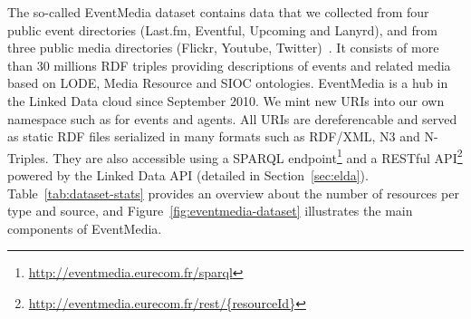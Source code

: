 The so-called EventMedia dataset contains data that we collected from four public event directories (Last.fm, Eventful, Upcoming and Lanyrd), and from three public media directories (Flickr, Youtube, Twitter)~\cite{Khrouf:SWJ12}. It consists of more than 30 millions RDF triples providing descriptions of events and related media based on LODE, Media Resource and SIOC ontologies. EventMedia is a hub in the Linked Data cloud since September 2010. We mint new URIs into our own namespace such as for
events and
agents. All URIs are dereferencable and served as static RDF files serialized in many formats such as RDF/XML, N3 and N-Triples. They are also accessible using a SPARQL endpoint\footnote{\url{http://eventmedia.eurecom.fr/sparql}} and a RESTful API\footnote{\url{http://eventmedia.eurecom.fr/rest/{resourceId}}} powered by the Linked Data API (detailed in Section~\ref{sec:elda}). Table~\ref{tab:dataset-stats} provides an overview about the number of resources per type and source, and Figure~\ref{fig:eventmedia-dataset} illustrates the main components of EventMedia.

\begin{table}[H]
\end{table}


